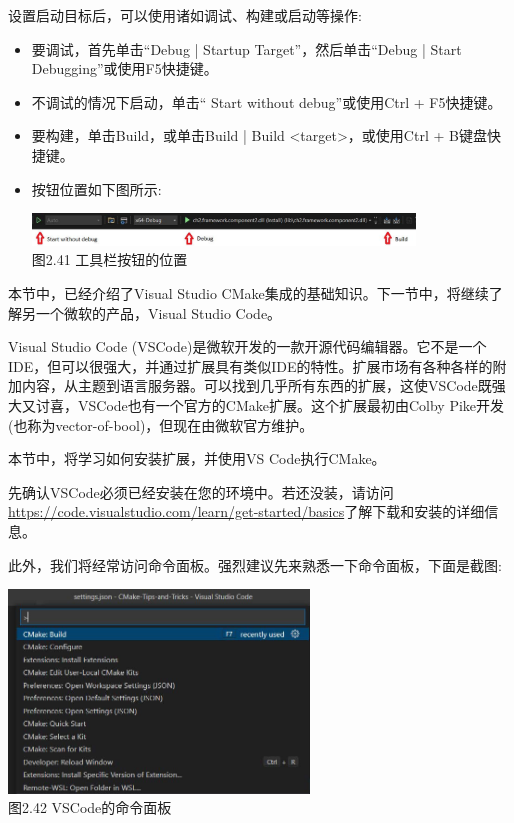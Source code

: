 设置启动目标后，可以使用诸如调试、构建或启动等操作:

\begin{itemize}
\item 
要调试，首先单击“Debug | Startup Target”，然后单击“Debug | Start Debugging”或使用F5快捷键。

\item 
不调试的情况下启动，单击“ Start without debug”或使用Ctrl + F5快捷键。

\item 
要构建，单击Build，或单击Build | Build <target>，或使用Ctrl + B键盘快捷键。

\item
按钮位置如下图所示:

\begin{center}
\includegraphics[width=0.8\textwidth]{content/1/chapter2/images/41.jpg}\\
图2.41 工具栏按钮的位置
\end{center}
\end{itemize}

本节中，已经介绍了Visual Studio CMake集成的基础知识。下一节中，将继续了解另一个微软的产品，Visual Studio Code。


Visual Studio Code (VSCode)是微软开发的一款开源代码编辑器。它不是一个IDE，但可以很强大，并通过扩展具有类似IDE的特性。扩展市场有各种各样的附加内容，从主题到语言服务器。可以找到几乎所有东西的扩展，这使VSCode既强大又讨喜，VSCode也有一个官方的CMake扩展。这个扩展最初由Colby Pike开发(也称为vector-of-bool)，但现在由微软官方维护。

本节中，将学习如何安装扩展，并使用VS Code执行CMake。

先确认VSCode必须已经安装在您的环境中。若还没装，请访问\url{https://code.visualstudio.com/learn/get-started/basics}了解下载和安装的详细信息。

此外，我们将经常访问命令面板。强烈建议先来熟悉一下命令面板，下面是截图:

\begin{center}
\includegraphics[width=0.6\textwidth]{content/1/chapter2/images/42.jpg}\\
图2.42 VSCode的命令面板
\end{center}


